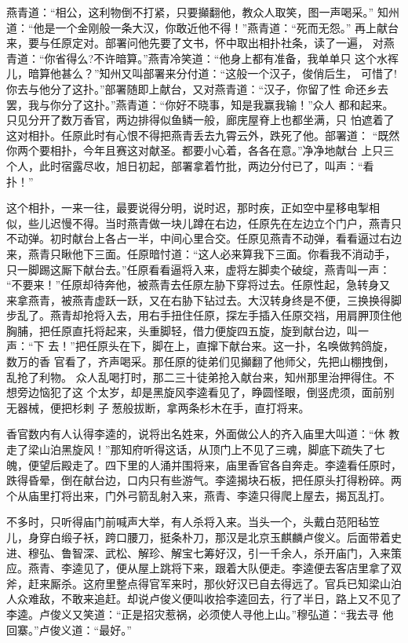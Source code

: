 燕青道：“相公，这利物倒不打紧，只要攧翻他，教众人取笑，图一声喝采。”
知州道：“他是一个金刚般一条大汉，你敢近他不得！”燕青道：“死而无怨。”
再上献台来，要与任原定对。部署问他先要了文书，怀中取出相扑社条，读了一遍，
对燕青道：“你省得么?不许暗算。”燕青冷笑道：“他身上都有准备，我单单只
这个水裈儿，暗算他甚么？”知州又叫部署来分付道：“这般一个汉子，俊俏后生，
可惜了!你去与他分了这扑。”部署随即上献台，又对燕青道：“汉子，你留了性
命还乡去罢，我与你分了这扑。”燕青道：“你好不晓事，知是我赢我输！”众人
都和起来。只见分开了数万香官，两边排得似鱼鳞一般，廊庑屋脊上也都坐满，只
怕遮着了这对相扑。任原此时有心恨不得把燕青丢去九霄云外，跌死了他。部署道：
“既然你两个要相扑，今年且赛这对献圣。都要小心着，各各在意。”净净地献台
上只三个人，此时宿露尽收，旭日初起，部署拿着竹批，两边分付已了，叫声：“看
扑！”

这个相扑，一来一往，最要说得分明，说时迟，那时疾，正如空中星移电掣相
似，些儿迟慢不得。当时燕青做一块儿蹲在右边，任原先在左边立个门户，燕青只
不动弹。初时献台上各占一半，中间心里合交。任原见燕青不动弹，看看逼过右边
来，燕青只瞅他下三面。任原暗忖道：“这人必来算我下三面。你看我不消动手，
只一脚踢这厮下献台去。”任原看看逼将入来，虚将左脚卖个破绽，燕青叫一声：
“不要来！”任原却待奔他，被燕青去任原左胁下穿将过去。任原性起，急转身又
来拿燕青，被燕青虚跃一跃，又在右胁下钻过去。大汉转身终是不便，三换换得脚
步乱了。燕青却抢将入去，用右手扭住任原，探左手插入任原交裆，用肩胛顶住他
胸脯，把任原直托将起来，头重脚轻，借力便旋四五旋，旋到献台边，叫一声：“下
去！”把任原头在下，脚在上，直撺下献台来。这一扑，名唤做鹁鸽旋，数万的香
官看了，齐声喝采。那任原的徒弟们见攧翻了他师父，先把山棚拽倒，乱抢了利物。
众人乱喝打时，那二三十徒弟抢入献台来，知州那里治押得住。不想旁边恼犯了这
个太岁，却是黑旋风李逵看见了，睁圆怪眼，倒竖虎须，面前别无器械，便把杉剌
子葱般拔断，拿两条杉木在手，直打将来。

香官数内有人认得李逵的，说将出名姓来，外面做公人的齐入庙里大叫道：“休
教走了梁山泊黑旋风！”那知府听得这话，从顶门上不见了三魂，脚底下疏失了七
魄，便望后殿走了。四下里的人涌并围将来，庙里香官各自奔走。李逵看任原时，
跌得昏晕，倒在献台边，口内只有些游气。李逵揭块石板，把任原头打得粉碎。两
个从庙里打将出来，门外弓箭乱射入来，燕青、李逵只得爬上屋去，揭瓦乱打。

不多时，只听得庙门前喊声大举，有人杀将入来。当头一个，头戴白范阳毡笠
儿，身穿白缎子袄，跨口腰刀，挺条朴刀，那汉是北京玉麒麟卢俊义。后面带着史
进、穆弘、鲁智深、武松、解珍、解宝七筹好汉，引一千余人，杀开庙门，入来策
应。燕青、李逵见了，便从屋上跳将下来，跟着大队便走。李逵便去客店里拿了双
斧，赶来厮杀。这府里整点得官军来时，那伙好汉已自去得远了。官兵已知梁山泊
人众难敌，不敢来追赶。却说卢俊义便叫收拾李逵回去，行了半日，路上又不见了
李逵。卢俊义又笑道：“正是招灾惹祸，必须使人寻他上山。”穆弘道：“我去寻
他回寨。”卢俊义道：“最好。”

